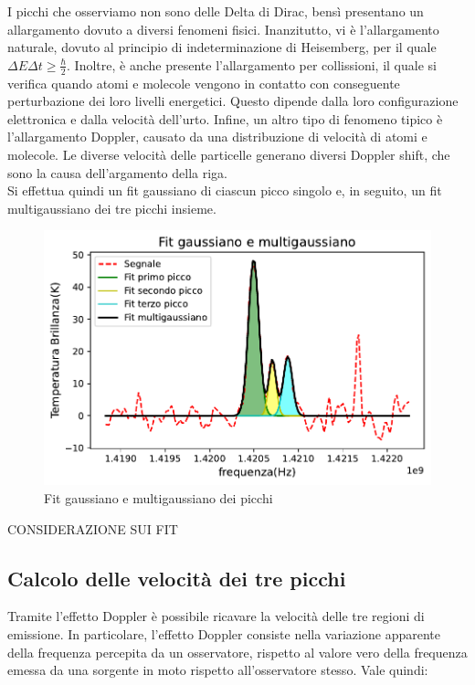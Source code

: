 I picchi che osserviamo non sono delle Delta di Dirac, bensì presentano un allargamento dovuto a diversi fenomeni fisici. Inanzitutto, vi è l'allargamento naturale, dovuto al principio di indeterminazione di Heisemberg, per il quale $\Delta E\Delta t\geq\frac{\hbar}{2}$. Inoltre, è anche presente l'allargamento per collissioni, il quale si verifica quando atomi e molecole vengono in contatto con conseguente perturbazione dei loro livelli energetici. Questo dipende dalla loro configurazione elettronica e dalla velocità dell'urto. Infine, un altro tipo di fenomeno tipico è l'allargamento Doppler, causato da una distribuzione di velocità di atomi e molecole. Le diverse velocità delle particelle generano diversi Doppler shift, che sono la causa dell'argamento della riga.\\
Si effettua quindi un fit gaussiano di ciascun picco singolo e, in seguito, un fit multigaussiano dei tre picchi insieme.

\begin{figure}[H]
	\centering
	\includegraphics[scale=0.8]{Tre_picchi.pdf}
	\caption{Fit gaussiano e multigaussiano dei picchi}
    	\label{fig:Tre_picchi}
\end{figure}

CONSIDERAZIONE SUI FIT

\subsection{Calcolo delle velocità dei tre picchi}
\label{Calcolo delle velocità dei tre picchi}

Tramite l'effetto Doppler è possibile ricavare la velocità delle tre regioni di emissione. In particolare, l'effetto Doppler consiste nella variazione apparente della frequenza percepita da un osservatore, rispetto al valore vero della frequenza emessa da una sorgente in moto rispetto all'osservatore stesso. Vale quindi:

